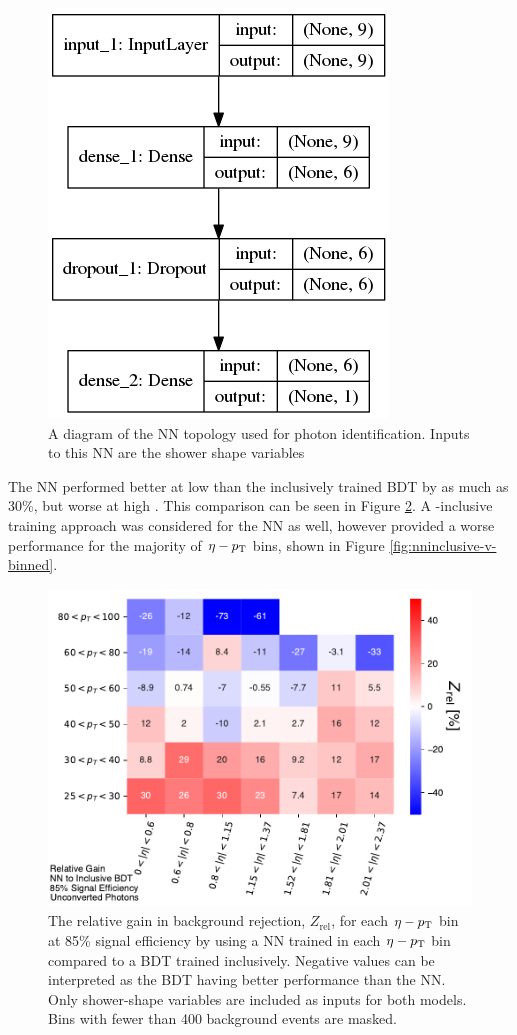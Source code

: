 
\begin{figure}
    \centering
    \includegraphics[width=.30\textwidth]{chapters/chapter4_photonID/images/model.png}
    \caption[A diagram of the \gls{NN} topology used for photon identification]
    {A diagram of the \gls{NN} topology used for photon identification. Inputs to this \gls{NN} are the shower shape variables}
    \label{fig:nn-model}
\end{figure}

The \gls{NN} performed better at low \pt than the inclusively trained \gls{BDT} by as much as 30\%, but worse at high \pt. This comparison can be seen in Figure \ref{fig:nn-v-bdt-unconverted}. A \pt-inclusive training approach was considered for the \gls{NN} as well, however provided a worse performance for the majority of $\eta-p_{\text{T}}$ bins, shown in Figure \ref{fig:nninclusive-v-binned}.

\begin{figure}[!htb]
    \centering
    \includegraphics[width=.85\textwidth]{chapters/chapter4_photonID/images/NN_v_BDTinclusive_normed.pdf}
    \caption[The relative gain in background rejection by using a \gls{NN} trained bin-wise compared to a \gls{BDT} trained inclusively]
    {The relative gain in background rejection, $Z_{\text{rel}}$, for each $\eta-p_{\text{T}}$ bin at 85\% signal efficiency by using a \gls{NN} trained in each $\eta-p_{\text{T}}$ bin compared to a \gls{BDT} trained inclusively. Negative values can be interpreted as the \gls{BDT} having better performance than the \gls{NN}. Only shower-shape variables are included as inputs for both models. Bins with fewer than 400 background events are masked.}
    \label{fig:nn-v-bdt-unconverted}
\end{figure}


